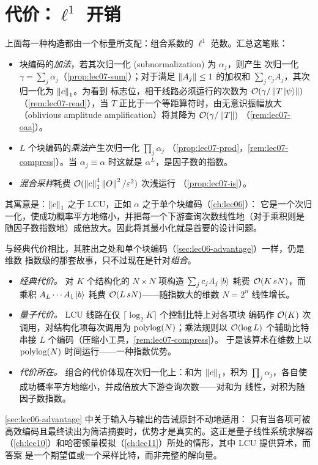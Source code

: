 \section{代价：\texorpdfstring{$\ell^1$}{l1} 开销}
\label{sec:lec07-5}

上面每一种构造都由一个标量所支配：组合系数的 $\ell^1$ 范数。汇总这笔账：

\begin{itemize}[leftmargin=1.4em,nosep]
  \item 块编码的\emph{加法}，若其次归一化 (subnormalization) 为 $\alpha_j$，则产生
        次归一化 $\gamma=\sum_j\alpha_j$（\cref{prop:lec07-sum}）；对于满足
        $\left\lVert A_j \right\rVert\le1$ 的加权和 $\sum_j c_j A_j$，其次归一化为 $\left\lVert c \right\rVert_1$。为看到
        标志位，相干线路必须运行的次数为 $\mathcal{O}(\gamma/\left\lVert T\ket{\psi} \right\rVert)$
        （\cref{rem:lec07-read}），当 $T$ 正比于一个等距算符时，由无意识振幅放大
        （oblivious amplitude amplification）将其降为 $\mathcal{O}(\gamma/\left\lVert T \right\rVert)$
        （\cref{rem:lec07-oaa}）。
  \item $L$ 个块编码的\emph{乘法}产生次归一化 $\prod_j\alpha_j$
        （\cref{prop:lec07-prod}，\cref{rem:lec07-compress}）。当 $\alpha_j\equiv\alpha$
        时这就是 $\alpha^L$，是因子数的指数。
  \item \emph{混合采样}耗费 $\mathcal{O}(\left\lVert c \right\rVert_1^4\left\lVert O \right\rVert^2/\varepsilon^2)$ 次浅运行
        （\cref{prop:lec07-is}）。
\end{itemize}

其寓意是：$\left\lVert c \right\rVert_1$ 之于 LCU，正如 $\alpha$ 之于单个块编码（\cref{ch:lec06}）：
它是一个次归一化，使成功概率平方地缩小，并把每一个下游查询次数线性地（对于乘积则是
随因子数指数地）成倍放大。因此将其最小化就是首要的设计问题。

\begin{remark}
\label{rem:lec07-advantage}
与经典代价相比，其胜出之处和单个块编码（\cref{sec:lec06-advantage}）一样，仍是维数
指数级的那套故事，只不过现在是针对\emph{组合}。
\begin{itemize}[leftmargin=1.4em,nosep]
  \item \emph{经典代价。} 对 $K$ 个结构化的 $N\times N$ 项构造
        $\sum_{j} c_j A_j\ket{b}$ 耗费 $\mathcal{O}(K\,sN)$，而乘积 $A_L\cdots A_1\ket{b}$
        耗费 $\mathcal{O}(L\,sN)$——随指数大的维数 $N=2^n$ 线性增长。
  \item \emph{量子代价。} LCU 线路在仅 $\lceil\log_2 K\rceil$ 个控制比特上对各项块
        编码作 $\mathcal{O}(K)$ 次调用，对结构化项每次调用为 $\operatorname{polylog}(N)$；乘法规则以
        $\mathcal{O}(\log L)$ 个辅助比特串接 $L$ 个编码（压缩小工具，\cref{rem:lec07-compress}）。
        于是该算术在维数上以 $\operatorname{polylog}(N)$ 时间运行——一种指数优势。
  \item \emph{代价所在。} 组合的代价体现在次归一化上：和为 $\left\lVert c \right\rVert_1$，积为
        $\prod_j\alpha_j$，各自使成功概率平方地缩小，并成倍放大下游查询次数——对和为
        线性，对积为随因子数指数。
\end{itemize}
\cref{sec:lec06-advantage} 中关于输入与输出的告诫原封不动地适用：
只有当各项可被高效编码且最终读出为简洁摘要时，优势才是真实的。这正是量子线性系统求解器
（\cref{ch:lec10}）和哈密顿量模拟（\cref{ch:lec11}）所处的情形，其中 LCU 提供算术，而答案
是一个期望值或一个采样比特，而非完整的解向量。
\end{remark}

